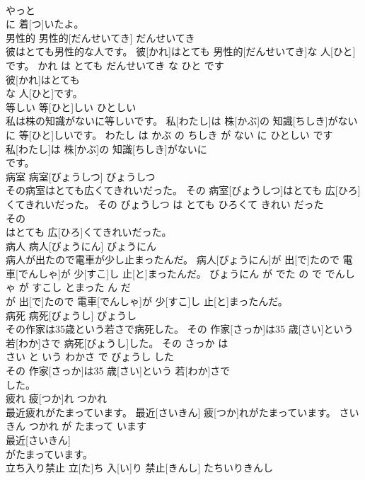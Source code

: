 \documentclass[8pt]{extreport}
\begin{document}
\begin{CJK}{UTF8}{min}
\\	やっと
\\	に 着[つ]いたよ。			
\\	男性的	男性的[だんせいてき]	だんせいてき	
\\	彼はとても男性的な人です。	彼[かれ]はとても 男性的[だんせいてき]な 人[ひと]です。	かれ は とても だんせいてき な ひと です	
\\	彼[かれ]はとても
\\	な 人[ひと]です。			
\\	等しい	等[ひと]しい	ひとしい	
\\	私は株の知識がないに等しいです。	私[わたし]は 株[かぶ]の 知識[ちしき]がないに 等[ひと]しいです。	わたし は かぶ の ちしき が ない に ひとしい です	
\\	私[わたし]は 株[かぶ]の 知識[ちしき]がないに
\\	です。			
\\	病室	病室[びょうしつ]	びょうしつ	
\\	その病室はとても広くてきれいだった。	その 病室[びょうしつ]はとても 広[ひろ]くてきれいだった。	その びょうしつ は とても ひろくて きれい だった	
\\	その
\\	はとても 広[ひろ]くてきれいだった。			
\\	病人	病人[びょうにん]	びょうにん	
\\	病人が出たので電車が少し止まったんだ。	病人[びょうにん]が 出[で]たので 電車[でんしゃ]が 少[すこ]し 止[と]まったんだ。	びょうにん が でた の で でんしゃ が すこし とまった ん だ	
\\	が 出[で]たので 電車[でんしゃ]が 少[すこ]し 止[と]まったんだ。			
\\	病死	病死[びょうし]	びょうし	
\\	その作家は35歳という若さで病死した。	その 作家[さっか]は35 歳[さい]という 若[わか]さで 病死[びょうし]した。	その さっか は 
\\	さい と いう わかさ で びょうし した	
\\	その 作家[さっか]は35 歳[さい]という 若[わか]さで
\\	した。			
\\	疲れ	疲[つか]れ	つかれ	
\\	最近疲れがたまっています。	最近[さいきん] 疲[つか]れがたまっています。	さいきん つかれ が たまって います	
\\	最近[さいきん]
\\	がたまっています。			
\\	立ち入り禁止	立[た]ち 入[い]り 禁止[きんし]	たちいりきんし	

\end{CJK}
\end{document}
